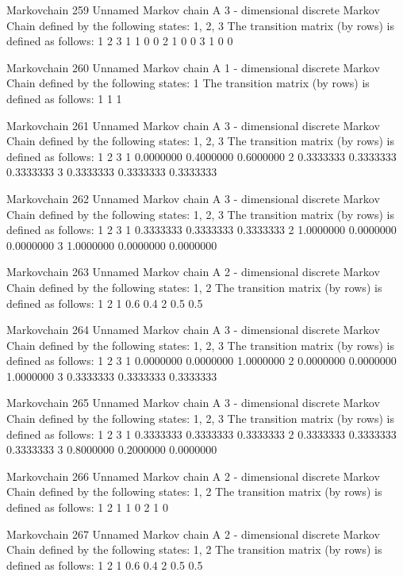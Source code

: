 \documentclass[
  nojss]{jss}
\begin{document}
\begin{CodeChunk}
\begin{CodeOutput}
Markovchain  259 
Unnamed Markov chain 
 A  3 - dimensional discrete Markov Chain defined by the following states: 
 1, 2, 3 
 The transition matrix  (by rows)  is defined as follows: 
  1 2 3
1 1 0 0
2 1 0 0
3 1 0 0

Markovchain  260 
Unnamed Markov chain 
 A  1 - dimensional discrete Markov Chain defined by the following states: 
 1 
 The transition matrix  (by rows)  is defined as follows: 
  1
1 1

Markovchain  261 
Unnamed Markov chain 
 A  3 - dimensional discrete Markov Chain defined by the following states: 
 1, 2, 3 
 The transition matrix  (by rows)  is defined as follows: 
          1         2         3
1 0.0000000 0.4000000 0.6000000
2 0.3333333 0.3333333 0.3333333
3 0.3333333 0.3333333 0.3333333

Markovchain  262 
Unnamed Markov chain 
 A  3 - dimensional discrete Markov Chain defined by the following states: 
 1, 2, 3 
 The transition matrix  (by rows)  is defined as follows: 
          1         2         3
1 0.3333333 0.3333333 0.3333333
2 1.0000000 0.0000000 0.0000000
3 1.0000000 0.0000000 0.0000000

Markovchain  263 
Unnamed Markov chain 
 A  2 - dimensional discrete Markov Chain defined by the following states: 
 1, 2 
 The transition matrix  (by rows)  is defined as follows: 
    1   2
1 0.6 0.4
2 0.5 0.5

Markovchain  264 
Unnamed Markov chain 
 A  3 - dimensional discrete Markov Chain defined by the following states: 
 1, 2, 3 
 The transition matrix  (by rows)  is defined as follows: 
          1         2         3
1 0.0000000 0.0000000 1.0000000
2 0.0000000 0.0000000 1.0000000
3 0.3333333 0.3333333 0.3333333

Markovchain  265 
Unnamed Markov chain 
 A  3 - dimensional discrete Markov Chain defined by the following states: 
 1, 2, 3 
 The transition matrix  (by rows)  is defined as follows: 
          1         2         3
1 0.3333333 0.3333333 0.3333333
2 0.3333333 0.3333333 0.3333333
3 0.8000000 0.2000000 0.0000000

Markovchain  266 
Unnamed Markov chain 
 A  2 - dimensional discrete Markov Chain defined by the following states: 
 1, 2 
 The transition matrix  (by rows)  is defined as follows: 
  1 2
1 1 0
2 1 0

Markovchain  267 
Unnamed Markov chain 
 A  2 - dimensional discrete Markov Chain defined by the following states: 
 1, 2 
 The transition matrix  (by rows)  is defined as follows: 
    1   2
1 0.6 0.4
2 0.5 0.5


\end{CodeOutput}
\end{CodeChunk}
\end{document}
